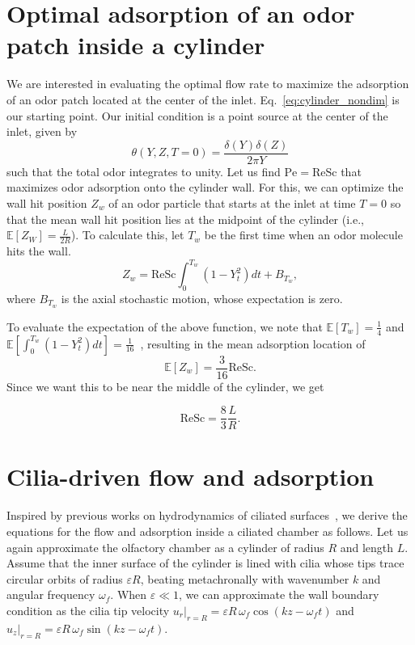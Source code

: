 \documentclass[%
 twocolumn,
 amsmath,amssymb,
 aps,prfluids,
 superscriptaddress,
]{revtex4-2}
\newcommand{\Sc}{\mathrm{Sc}}
\newcommand{\Rey}{\mathrm{Re}}
\begin{document}
\section{Optimal adsorption of an odor patch inside a cylinder}
\label{app:instantaneous}

We are interested in evaluating the optimal flow rate to maximize the adsorption of an odor patch located at the center of the inlet. Eq.~\eqref{eq:cylinder_nondim} is our starting point. Our initial condition is a point source at the center of the inlet, given by
\begin{equation}
    \theta(Y,Z,T=0) = \frac{\delta(Y)\delta(Z)}{2\pi Y}
\end{equation}
such that the total odor integrates to unity. Let us find $\mathrm{Pe}=\Rey\Sc$ that maximizes odor adsorption onto the cylinder wall. For this, we can optimize the wall hit position $Z_w$ of an odor particle that starts at the inlet at time $T=0$ so that the mean wall hit position lies at the midpoint of the cylinder (i.e., $\mathbb E\left[Z_W\right] = \frac{L}{2R}$).
To calculate this, let $T_w$ be the first time when an odor molecule hits the wall.
\begin{equation}
    Z_w = \Rey\Sc\int_0^{T_w}(1-Y_t^2)dt + B_{T_w},
\end{equation}
where $B_{T_w}$ is the axial stochastic motion, whose expectation is zero.

To evaluate the expectation of the above function, we note that $\mathbb E\left[T_w\right]=\frac{1}{4}$ and $\mathbb E\left[\int_0^{T_w}(1-Y_t^2)dt\right]=\frac{1}{16}$~\cite{koralov2007theory}, resulting in the mean adsorption location of
\begin{equation}
    \mathbb E\left[Z_w\right] = \frac{3}{16}\Rey\Sc.
\end{equation}
Since we want this to be near the middle of the cylinder, we get

\begin{equation}
    \Rey\Sc=\frac{8}{3}\frac{L}{R}.
\end{equation}

\section{Cilia-driven flow and adsorption}
\label{app:cilia}

Inspired by previous works on hydrodynamics of ciliated surfaces~\cite{brennen1974oscillating,blake1971spherical}, we derive the equations for the flow and adsorption inside a ciliated chamber as follows. Let us again approximate the olfactory chamber as a cylinder of radius $R$ and length $L$. Assume that the inner surface of the cylinder is lined with cilia whose tips trace circular orbits of radius $\varepsilon R$, beating metachronally with wavenumber $k$ and angular frequency $\omega_f$. When $\varepsilon\ll 1$, we can approximate the wall boundary condition as the cilia tip velocity $u_r|_{r=R}=\varepsilon R\,\omega_f\cos(kz-\omega_f t)$ and $u_z|_{r=R}=\varepsilon R\,\omega_f\sin(kz-\omega_f t)$. 
\end{document}
